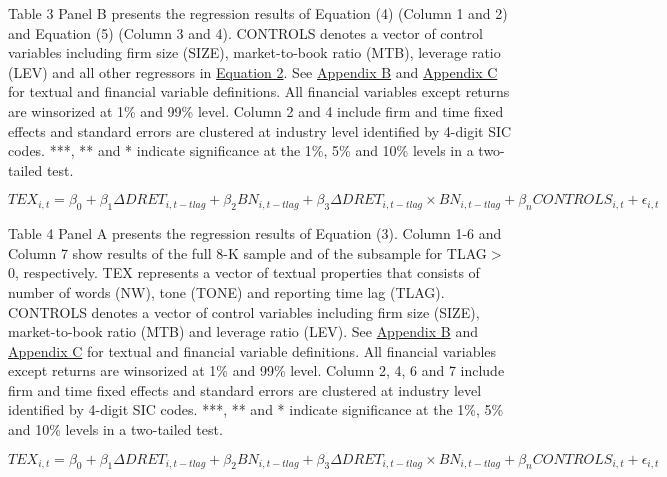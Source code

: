 Table 3 Panel B presents the regression results of Equation (4) (Column 1 and 2) and Equation (5) (Column 3 and 4). CONTROLS denotes a vector of control variables including firm size (SIZE), market-to-book ratio (MTB), leverage ratio (LEV) and all other regressors in \hyperref[eq2]{Equation 2}. See \hyperref[appb]{Appendix B} and \hyperref[appc]{Appendix C} for textual and financial variable definitions. All financial variables except returns are winsorized at 1\% and 99\% level. Column 2 and 4 include firm and time fixed effects and standard errors are clustered at industry level identified by 4-digit SIC codes. ***, ** and * indicate significance at the 1\%, 5\% and 10\% levels in a two-tailed test.

\newpage

\setcounter{equation}{2}
\begin{equation}
TEX_{i,t}=\beta_0+\beta_1\Delta DRET_{i,t-tlag}+\beta_2BN_{i,t-tlag}+\beta_3\Delta DRET_{i,t-tlag}\times BN_{i,t-tlag}+\beta_nCONTROLS_{i,t}+\epsilon_{i,t}
\end{equation}

Table 4 Panel A presents the regression results of Equation (3). Column 1-6 and Column 7 show results of the full 8-K sample and of the subsample for TLAG$>$0, respectively. TEX represents a vector of textual properties that consists of number of words (NW), tone (TONE) and reporting time lag (TLAG). CONTROLS denotes a vector of control variables including firm size (SIZE), market-to-book ratio (MTB) and leverage ratio (LEV). See \hyperref[appb]{Appendix B} and \hyperref[appc]{Appendix C} for textual and financial variable definitions. All financial variables except returns are winsorized at 1\% and 99\% level. Column 2, 4, 6 and 7 include firm and time fixed effects and standard errors are clustered at industry level identified by 4-digit SIC codes. ***, ** and * indicate significance at the 1\%, 5\% and 10\% levels in a two-tailed test.

\newpage

\setcounter{equation}{2}
\begin{equation}
TEX_{i,t}=\beta_0+\beta_1\Delta DRET_{i,t-tlag}+\beta_2BN_{i,t-tlag}+\beta_3\Delta DRET_{i,t-tlag}\times BN_{i,t-tlag}+\beta_nCONTROLS_{i,t}+\epsilon_{i,t}
\end{equation}

